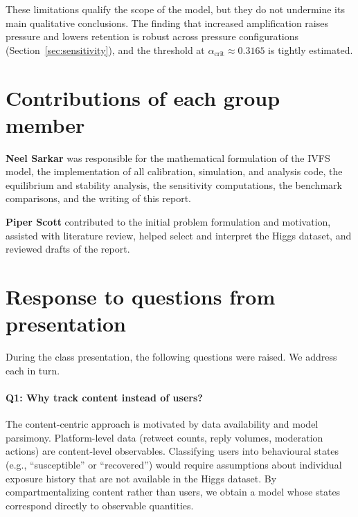 \documentclass[11pt]{article}
\begin{document}
These limitations qualify the scope of the model, but they do not undermine its main qualitative conclusions. The finding that increased amplification raises pressure and lowers retention is robust across pressure configurations (Section~\ref{sec:sensitivity}), and the threshold at $\alpha_{\mathrm{crit}} \approx 0.3165$ is tightly estimated.


\section{Contributions of each group member}
\label{sec:contributions}

\textbf{Neel Sarkar} was responsible for the mathematical formulation of the IVFS model, the implementation of all calibration, simulation, and analysis code, the equilibrium and stability analysis, the sensitivity computations, the benchmark comparisons, and the writing of this report.

\textbf{Piper Scott} contributed to the initial problem formulation and motivation, assisted with literature review, helped select and interpret the Higgs dataset, and reviewed drafts of the report.


\section{Response to questions from presentation}
\label{sec:questions}

During the class presentation, the following questions were raised. We address each in turn.

\paragraph{Q1: Why track content instead of users?}
The content-centric approach is motivated by data availability and model parsimony. Platform-level data (retweet counts, reply volumes, moderation actions) are content-level observables. Classifying users into behavioural states (e.g., ``susceptible'' or ``recovered'') would require assumptions about individual exposure history that are not available in the Higgs dataset. By compartmentalizing content rather than users, we obtain a model whose states correspond directly to observable quantities.
\end{document}
